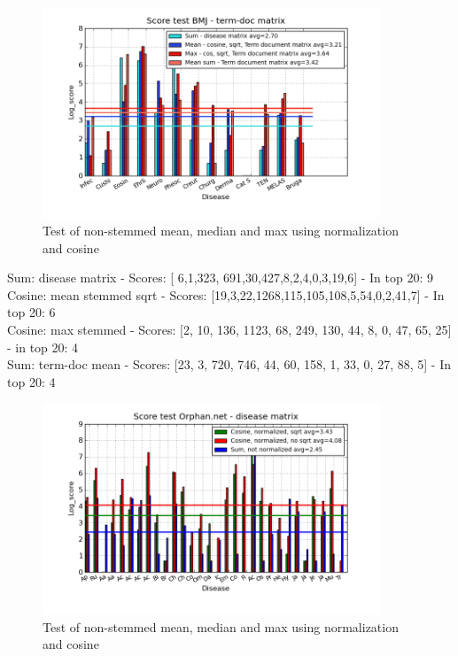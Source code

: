 \begin{figure}[h!]
        \begin{center}
          \includegraphics[width=0.9\textwidth]{barcharts/termDoc_bmj_hist_3000_sum_dm_mea_cos_sqrt_td_max_cos_sqrt_td_mea_sum_td.png}
        \end{center}
        \caption{Test of non-stemmed mean, median and max using normalization and cosine}
        \label{termDoc_bmj_hist_3000_sum_dm_mea_cos_sqrt_td_max_cos_sqrt_td_mea_sum_td}
\end{figure}
{\small
Sum: disease matrix - Scores: [ 6,1,323, 691,30,427,8,2,4,0,3,19,6] - In top 20: 9 \\
Cosine: mean stemmed sqrt - Scores: [19,3,22,1268,115,105,108,5,54,0,2,41,7] - In top 20: 6 \\
Cosine: max stemmed - Scores: [2, 10, 136, 1123, 68, 249, 130, 44, 8, 0, 47, 65, 25] - in top 20: 4 \\
Sum: term-doc mean - Scores: [23, 3, 720, 746, 44, 60, 158, 1, 33, 0, 27, 88, 5] - In top 20: 4
}
\begin{figure}[h!]
        \begin{center}
          \includegraphics[width=0.9\textwidth]{barcharts/diseaseMatrix_orphan_hist_NOTnorm_3000_s_cos_sqrt_cos_sum_nn.png}
        \end{center}
        \caption{Test of non-stemmed mean, median and max using normalization and cosine}
        \label{termDoc_orphan_hist_3000_sum_dm_mea_cos_sqrt_td_max_cos_sqrt_td_mea_sum_nn_td}
\end{figure}
